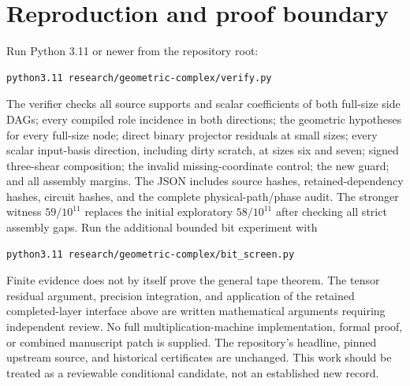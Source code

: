 \documentclass[11pt]{article}
\begin{document}
\section{Reproduction and proof boundary}
Run Python 3.11 or newer from the repository root:
\begin{verbatim}
python3.11 research/geometric-complex/verify.py
\end{verbatim}
The verifier checks all source supports and scalar coefficients of both
full-size side DAGs; every compiled role incidence in both directions;
the geometric hypotheses for every full-size node; direct binary projector
residuals at small sizes; every scalar input-basis direction, including dirty
scratch, at sizes six and seven; signed three-shear composition; the invalid
missing-coordinate control; the new guard; and all assembly margins.
The JSON includes source hashes, retained-dependency hashes, circuit hashes,
and the complete physical-path/phase audit. The stronger witness
$59/10^{11}$ replaces the initial exploratory $58/10^{11}$ after checking
all strict assembly gaps. Run the additional bounded bit experiment with
\begin{verbatim}
python3.11 research/geometric-complex/bit_screen.py
\end{verbatim}

Finite evidence does not by itself prove the general tape theorem.
The tensor residual argument, precision integration, and application of the
retained completed-layer interface above are written mathematical arguments
requiring independent review. No full multiplication-machine implementation,
formal proof, or combined manuscript patch is supplied. The repository's
headline, pinned upstream source, and historical certificates are unchanged.
This work should be treated as a reviewable conditional candidate, not an
established new record.
\end{document}
